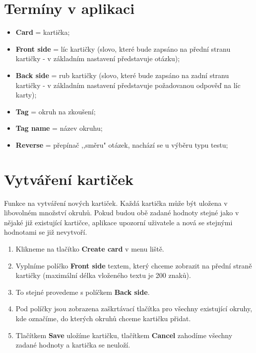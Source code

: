 \documentclass[12pt]{article}
\providecommand{\tightlist}{\setlength{\itemsep}{1pt}\setlength{\parskip}{1pt}}
\begin{document}
\hypertarget{termuxedny-v-aplikaci}{%
\section{Termíny v aplikaci}\label{termuxedny-v-aplikaci}}

\begin{itemize}
\tightlist
\item
  \textbf{Card} = kartička;
\item
  \textbf{Front side} = líc kartičky (slovo, které bude zapsáno na
  přední stranu kartičky - v základním nastavení představuje otázku);
\item
  \textbf{Back side} = rub kartičky (slovo, které bude zapsáno na zadní
  stranu kartičky - v základním nastavení představuje požadovanou
  odpověď na líc karty);
\item
  \textbf{Tag} = okruh na zkoušení;
\item
  \textbf{Tag name} = název okruhu;
\item
  \textbf{Reverse} = přepínač ,,směru" otázek, nachází se u výběru typu
  testu;
\end{itemize}

\hypertarget{vytvuxe1ux159enuxed-kartiux10dek}{%
\section{Vytváření kartiček}\label{vytvuxe1ux159enuxed-kartiux10dek}}

Funkce na vytváření nových kartiček. Každá kartička může být uložena v
libovolném množství okruhů. Pokud budou obě zadané hodnoty stejné jako v
nějaké již existující kartičce, aplikace upozorní uživatele a nová se
stejnými hodnotami se již nevytvoří.

\begin{enumerate}
\def\labelenumi{\arabic{enumi}.}
\tightlist
\item
  Klikneme na tlačítko \textbf{Create card} v menu liště.
\item
  Vyplníme políčko \textbf{Front side} textem, který chceme zobrazit na
  přední straně kartičky (maximální délka vloženého textu je 200 znaků).
\item
  To stejné provedeme s políčkem \textbf{Back side}.
\item
  Pod políčky jsou zobrazena zaškrtávací tlačítka pro všechny existující
  okruhy, kde označíme, do kterých okruhů chceme kartičku přidat.
\item
  Tlačítkem \textbf{Save} uložíme kartičku, tlačítkem \textbf{Cancel}
  zahodíme všechny zadané hodnoty a kartička se neuloží.
\end{enumerate}
\end{document}
